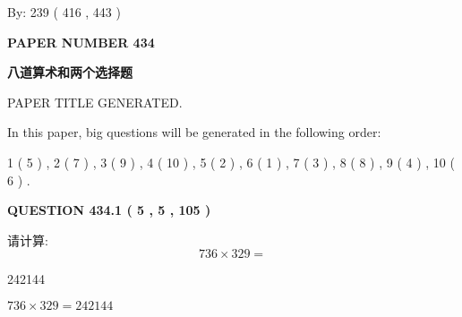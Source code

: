 \documentclass{ctexart}
\begin{document}
   
\hspace{1.0in} By: 
 239 ( 416 ,  443 )
   
   
   
   
\newpage 
\setcounter{page}{ 
   434001 } 
   
   
   
   
 {\textbf{ \Large{ PAPER NUMBER  434  }}}
   
   
\vspace{0.2in}
   
   
   
   
   
   
   
   
 \vspace{0.2in}
{\LARGE {\textbf{ 八道算术和两个选择题}}}
   
   
 PAPER TITLE GENERATED.
   
   
   
\vspace{0.2in}
   
In this paper, big questions will be generated in the following order: 
   
   
   1 ( 5 )
 ,
   2 ( 7 )
 ,
   3 ( 9 )
 ,
   4 ( 10 )
 ,
   5 ( 2 )
 ,
   6 ( 1 )
 ,
   7 ( 3 )
 ,
   8 ( 8 )
 ,
   9 ( 4 )
 ,
   10 ( 6 )
 .
  
\vspace{0.2in}
  
{\textbf{\Large{QUESTION
434.1 
 ( 5 , 5 , 105 )
}}}
  
  
 
请计算:
\begin{equation}
736  \times    %
329 = \nonumber
\end{equation}
 
 
 
\noindent{}
 
 

242144
 
 
\noindent{}
 
 

 
 
 
\noindent{}
 
 

$ %
736 \times  %
329=   %
242144$
 
\end{document}
